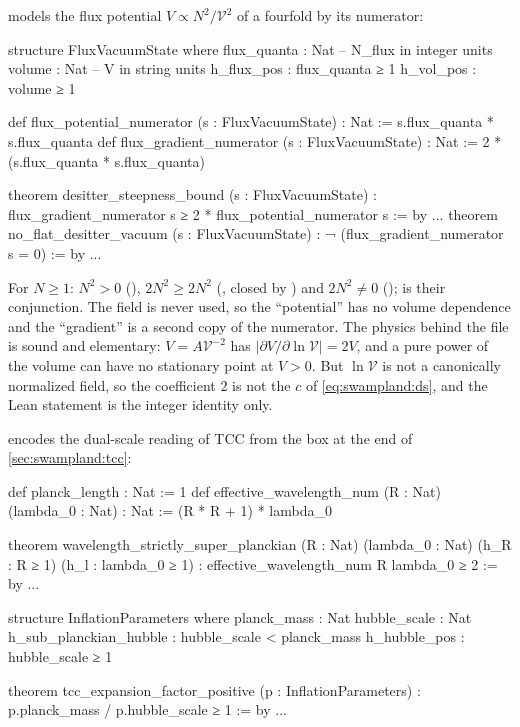 models the flux potential $V\propto
N^2/\mathcal V^2$ of a fourfold by its numerator:
\begin{leancode}
structure FluxVacuumState where
  flux_quanta : Nat        -- N_flux in integer units
  volume : Nat             -- V in string units
  h_flux_pos : flux_quanta ≥ 1
  h_vol_pos : volume ≥ 1

def flux_potential_numerator (s : FluxVacuumState) : Nat :=
  s.flux_quanta * s.flux_quanta
def flux_gradient_numerator (s : FluxVacuumState) : Nat :=
  2 * (s.flux_quanta * s.flux_quanta)

theorem desitter_steepness_bound (s : FluxVacuumState) :
    flux_gradient_numerator s ≥ 2 * flux_potential_numerator s := by ...
theorem no_flat_desitter_vacuum (s : FluxVacuumState) :
    ¬ (flux_gradient_numerator s = 0) := by ...
\end{leancode}

\begin{leanbox}
For $N\ge1$: $N^2>0$ (), $2N^2\ge2N^2$
(, closed by ) and $2N^2\ne0$
();  is their
conjunction. The field  is never used, so the ``potential'' has no volume
dependence and the ``gradient'' is a second copy of the numerator. The physics behind the file is
sound and elementary: $V=A\mathcal V^{-2}$ has $|\partial V/\partial\ln\mathcal V|=2V$, and a pure
power of the volume can have no stationary point at $V>0$. But $\ln\mathcal V$ is not a canonically
normalized field, so the coefficient $2$ is not the $c$ of \eqref{eq:swampland:ds}, and the Lean
statement is the integer identity only.
\end{leanbox}

 encodes the dual-scale reading of TCC from
the box at the end of \cref{sec:swampland:tcc}:
\begin{leancode}
def planck_length : Nat := 1
def effective_wavelength_num (R : Nat) (lambda_0 : Nat) : Nat :=
  (R * R + 1) * lambda_0

theorem wavelength_strictly_super_planckian
    (R : Nat) (lambda_0 : Nat) (h_R : R ≥ 1) (h_l : lambda_0 ≥ 1) :
    effective_wavelength_num R lambda_0 ≥ 2 := by ...

structure InflationParameters where
  planck_mass : Nat
  hubble_scale : Nat
  h_sub_planckian_hubble : hubble_scale < planck_mass
  h_hubble_pos : hubble_scale ≥ 1

theorem tcc_expansion_factor_positive (p : InflationParameters) :
    p.planck_mass / p.hubble_scale ≥ 1 := by ...
\end{leancode}

